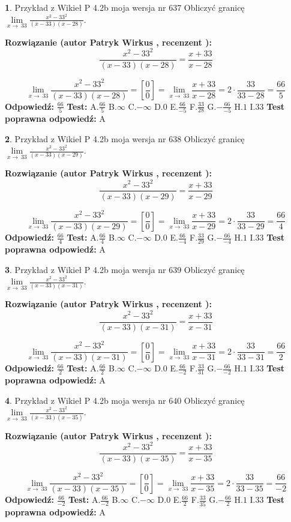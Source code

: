 \documentclass[12pt, a4paper]{article}
\theoremstyle{definition} %
\newtheorem{zad}{}
\newcommand{\zadStart}[1]{\begin{zad}#1\newline}
\newcommand{\zadStop}{\end{zad}}
\newcommand{\rozwStart}[2]{\noindent \textbf{Rozwiązanie (autor #1 , recenzent #2): }\newline}
\newcommand{\rozwStop}{\newline}
\newcommand{\odpStart}{\noindent \textbf{Odpowiedź:}\newline}
\newcommand{\odpStop}{\newline}
\newcommand{\testStart}{\noindent \textbf{Test:}\newline}
\newcommand{\testStop}{\newline}
\newcommand{\kluczStart}{\noindent \textbf{Test poprawna odpowiedź:}\newline}
\newcommand{\kluczStop}{\newline}
\begin{document}
\zadStart{Przykład z Wikieł P 4.2b moja wersja nr 637}
Obliczyć granicę $\lim\limits_{x\to\ 33}\frac{x^{2}-33^{2}}{(x-33)(x-28)}$.
\zadStop
\rozwStart{Patryk Wirkus}{}
$$\frac{x^{2}-33^{2}}{(x-33)(x-28)}=\frac{x+33}{x-28}$$

$$\lim\limits_{x\to\ 33}\frac{x^{2}-33^{2}}{(x-33)(x-28)}=[\frac{0}{0}]=\lim\limits_{x\to\ 33}\frac{x+33}{x-28}=2 \cdot \frac{33}{33-28} = \frac{66}{5}$$
\rozwStop
\odpStart
$\frac{66}{5}$
\odpStop
\testStart
A.$\frac{66}{5}$
B.$\infty$
C.$-\infty$
D.$0$
E.$\frac{66}{-5}$
F.$\frac{33}{28}$
G.$-\frac{66}{-5}$
H.$1$
I.$33$
\testStop
\kluczStart
A
\kluczStop



\zadStart{Przykład z Wikieł P 4.2b moja wersja nr 638}
Obliczyć granicę $\lim\limits_{x\to\ 33}\frac{x^{2}-33^{2}}{(x-33)(x-29)}$.
\zadStop
\rozwStart{Patryk Wirkus}{}
$$\frac{x^{2}-33^{2}}{(x-33)(x-29)}=\frac{x+33}{x-29}$$

$$\lim\limits_{x\to\ 33}\frac{x^{2}-33^{2}}{(x-33)(x-29)}=[\frac{0}{0}]=\lim\limits_{x\to\ 33}\frac{x+33}{x-29}=2 \cdot \frac{33}{33-29} = \frac{66}{4}$$
\rozwStop
\odpStart
$\frac{66}{4}$
\odpStop
\testStart
A.$\frac{66}{4}$
B.$\infty$
C.$-\infty$
D.$0$
E.$\frac{66}{-4}$
F.$\frac{33}{29}$
G.$-\frac{66}{-4}$
H.$1$
I.$33$
\testStop
\kluczStart
A
\kluczStop



\zadStart{Przykład z Wikieł P 4.2b moja wersja nr 639}
Obliczyć granicę $\lim\limits_{x\to\ 33}\frac{x^{2}-33^{2}}{(x-33)(x-31)}$.
\zadStop
\rozwStart{Patryk Wirkus}{}
$$\frac{x^{2}-33^{2}}{(x-33)(x-31)}=\frac{x+33}{x-31}$$

$$\lim\limits_{x\to\ 33}\frac{x^{2}-33^{2}}{(x-33)(x-31)}=[\frac{0}{0}]=\lim\limits_{x\to\ 33}\frac{x+33}{x-31}=2 \cdot \frac{33}{33-31} = \frac{66}{2}$$
\rozwStop
\odpStart
$\frac{66}{2}$
\odpStop
\testStart
A.$\frac{66}{2}$
B.$\infty$
C.$-\infty$
D.$0$
E.$\frac{66}{-2}$
F.$\frac{33}{31}$
G.$-\frac{66}{-2}$
H.$1$
I.$33$
\testStop
\kluczStart
A
\kluczStop



\zadStart{Przykład z Wikieł P 4.2b moja wersja nr 640}
Obliczyć granicę $\lim\limits_{x\to\ 33}\frac{x^{2}-33^{2}}{(x-33)(x-35)}$.
\zadStop
\rozwStart{Patryk Wirkus}{}
$$\frac{x^{2}-33^{2}}{(x-33)(x-35)}=\frac{x+33}{x-35}$$

$$\lim\limits_{x\to\ 33}\frac{x^{2}-33^{2}}{(x-33)(x-35)}=[\frac{0}{0}]=\lim\limits_{x\to\ 33}\frac{x+33}{x-35}=2 \cdot \frac{33}{33-35} = \frac{66}{-2}$$
\rozwStop
\odpStart
$\frac{66}{-2}$
\odpStop
\testStart
A.$\frac{66}{-2}$
B.$\infty$
C.$-\infty$
D.$0$
E.$\frac{66}{2}$
F.$\frac{33}{35}$
G.$-\frac{66}{2}$
H.$1$
I.$33$
\testStop
\kluczStart
A
\kluczStop
\end{document}
